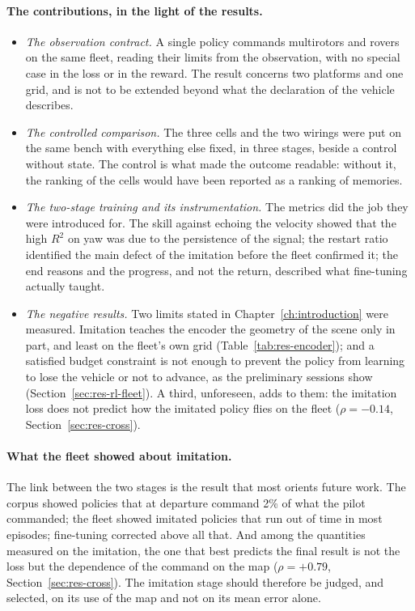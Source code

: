 \paragraph{The contributions, in the light of the results.}
\begin{itemize}
  \item \emph{The observation contract.} A single policy commands multirotors
        and rovers on the same fleet, reading their limits from the
        observation, with no special case in the loss or in the reward. The
        result concerns two platforms and one grid, and is not to be extended
        beyond what the declaration of the vehicle describes.
  \item \emph{The controlled comparison.} The three cells and the two wirings
        were put on the same bench with everything else fixed, in three stages,
        beside a control without state. The control is what made the outcome
        readable: without it, the ranking of the cells would have been reported
        as a ranking of memories.
  \item \emph{The two-stage training and its instrumentation.} The metrics did
        the job they were introduced for. The skill against echoing the velocity
        showed that the high $R^2$ on yaw was due to the persistence of the
        signal; the restart ratio identified the main defect of the imitation
        before the fleet confirmed it; the end reasons and the progress, and not
        the return, described what fine-tuning actually taught.
  \item \emph{The negative results.} Two limits stated in
        Chapter~\ref{ch:introduction} were measured. Imitation teaches the
        encoder the geometry of the scene only in part, and least on the fleet's
        own grid (Table~\ref{tab:res-encoder}); and a satisfied budget
        constraint is not enough to prevent the policy from learning to lose the
        vehicle or not to advance, as the preliminary sessions show
        (Section~\ref{sec:res-rl-fleet}). A third, unforeseen, adds to them: the
        imitation loss does not predict how the imitated policy flies on the
        fleet ($\rho = -0.14$, Section~\ref{sec:res-cross}).
\end{itemize}

\paragraph{What the fleet showed about imitation.}
The link between the two stages is the result that most orients future work.
The corpus showed policies that at departure command 2\% of what the pilot
commanded; the fleet showed imitated policies that run out of time in most
episodes; fine-tuning corrected above all that. And among the quantities
measured on the imitation, the one that best predicts the final result is not
the loss but the dependence of the command on the map ($\rho = +0.79$,
Section~\ref{sec:res-cross}). The imitation stage should therefore be judged,
and selected, on its use of the map and not on its mean error alone.



